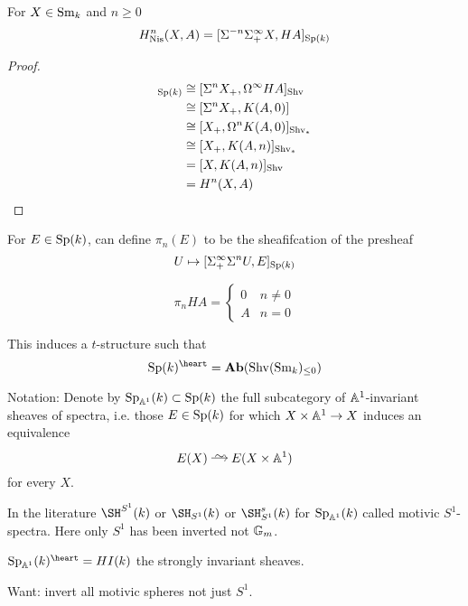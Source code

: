 \documentclass[12pt]{article}
\begin{document}
\begin{prop}
For $X \in \mathrm{Sm}_k$ and $n \ge 0$
\[ H^n_{\mathrm{Nis}}(X, A) = [ \Sigma^{-n} \Sigma^\infty_+ X, H A]_{\mathrm{Sp}(k)} \]
\end{prop}

\begin{proof}
\begin{align*}
[\Sigma_+^\infty \Sigma^n X, HA]_{\Sp(k)} & \cong [\Sigma^n X_+, \Omega^\infty HA]_{\Shv}
\\
& \cong [\Sigma^n X_+, K(A, 0)] 
\\
& \cong [ X_+, \Omega^n K(A, 0)]_{\Shv_*}
\\
& \cong [X_+, K(A,n)]_{\Shv_*} 
\\
& = [X, K(A,n)]_{\Shv}
\\
& = H^n(X, A)
\end{align*}
\end{proof}

\begin{defn}
For $E \in \mathrm{Sp}(k)$, can define $\pi_n(E)$ to be the sheafifcation of the presheaf
\[ U \mapsto [\Sigma_+^\infty \Sigma^n U, E]_{\mathrm{Sp}(k)} \]
\end{defn}

\begin{example}
\[ \pi_n HA = 
\begin{cases}
0 & n \neq 0
\\
A & n = 0
\end{cases} \]
\end{example}

This induces a $t$-structure such that
\[ \Sp(k)^{\heart} = \Ab(\Shv(\Sm_k)_{\le 0}) \]

Notation: Denote by $\mathrm{Sp}_{\mathbb{A}^1}(k) \subset \mathrm{Sp}(k)$ the full subcategory of $\mathbb{A}^1$-invariant sheaves of spectra, i.e. those $E \in \mathrm{Sp}(k)$ for which $X \times \mathbb{A}^1 \to X$ induces an equivalence
\[ E(X) \iso E(X \times \A^1) \]
for every $X$. 

\begin{rmk}
In the literature $\SH^{S^1}(k)$ or $\SH_{S^1}(k)$ or $\SH_{S^1}^s(k)$ for $\mathrm{Sp}_{\mathbb{A}^1}(k)$ called motivic $S^1$-spectra. Here only $S^1$ has been inverted not $\mathbb{G}_m$. 
\end{rmk}

\begin{rmk}
$\Sp_{\A^1}(k)^{\heart} = HI(k)$ the strongly invariant sheaves. 
\end{rmk}

Want: invert all motivic spheres not just $S^1$. 
\end{document}
